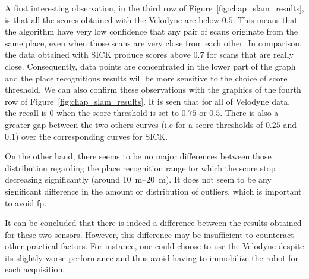 A first interesting observation, in the third row of Figure~\ref{fig:chap_slam_results}, is that all the scores obtained with the Velodyne are below $0.5$. This means that the algorithm have very low confidence that any pair of scans originate from the same place, even when those scans are very close from each other. In comparison, the data obtained with SICK produce scores above 0.7 for scans that are really close. Consequently, data points are concentrated in the lower part of the graph and the place recognitions results will be more sensitive to the choice of score threshold. We can also confirm these observations with the graphics of the fourth row of Figure~\ref{fig:chap_slam_results}. It is seen that for all of Velodyne data, the recall is 0 when the score threshold is set to $0.75$ or $0.5$. There is also a greater gap between the two others curves (i.e for a score thresholds of $0.25$ and $0.1$) over the corresponding curves for SICK.

On the other hand, there seems to be no major differences between those distribution regarding the place recognition range for which the score stop decreasing significantly (around \SIrange{10}{20}{\meter}). It does not seem to be any significant difference in the amount or distribution of outliers, which is important to avoid \gls*{fp}. 

It can be concluded that there is indeed a difference between the results obtained for these two sensors. However, this difference may be insufficient to counteract other practical factors. For instance, one could choose to use the Velodyne despite its slightly worse performance and thus avoid having to immobilize the robot for each acquisition.

